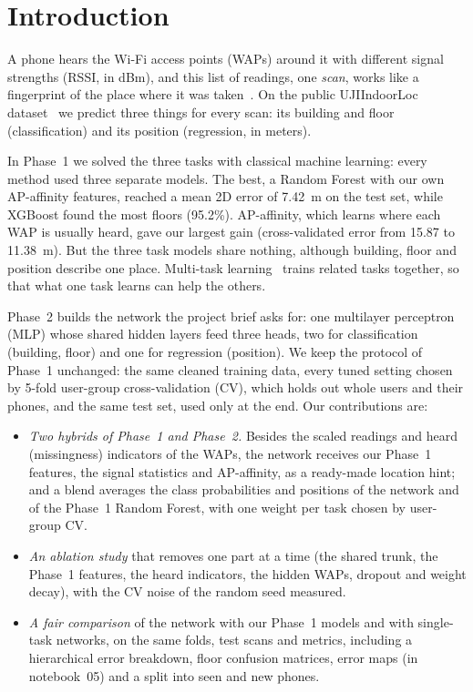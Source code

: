 \section{Introduction}\label{sec:intro}

A phone hears the Wi-Fi access points (WAPs) around it with different signal
strengths (RSSI, in dBm), and this list of readings, one \emph{scan}, works
like a fingerprint of the place where it was taken~\cite{he2016wifi}. On the
public UJIIndoorLoc dataset~\cite{torres2014ujiindoorloc} we predict three
things for every scan: its building and floor (classification) and its
position (regression, in meters).

In Phase~1 we solved the three tasks with classical machine learning: every
method used three separate models. The best, a Random Forest with our own
AP-affinity features, reached a mean 2D error of 7.42~m on the test set, while
XGBoost found the most floors (95.2\%). AP-affinity, which learns where each
WAP is usually heard, gave our largest gain (cross-validated error from 15.87
to 11.38~m). But the three task models share nothing, although building, floor
and position describe one place. Multi-task learning~\cite{caruana1997multitask}
trains related tasks together, so that what one task learns can help the
others.

Phase~2 builds the network the project brief asks for: one multilayer
perceptron (MLP) whose shared hidden layers feed three heads, two for
classification (building, floor) and one for regression (position). We keep the
protocol of Phase~1 unchanged: the same cleaned training data, every tuned
setting chosen by 5-fold user-group cross-validation (CV), which holds out whole
users and their phones, and the same test set, used only at the end. Our
contributions are:
\begin{itemize}
\item \emph{Two hybrids of Phase~1 and Phase~2.} Besides the scaled readings
  and heard (missingness) indicators of the WAPs, the network receives our
  Phase~1 features, the signal statistics and AP-affinity, as a ready-made
  location hint; and a blend averages the class probabilities and positions of
  the network and of the Phase~1 Random Forest, with one weight per task chosen
  by user-group CV.
\item \emph{An ablation study} that removes one part at a time (the shared
  trunk, the Phase~1 features, the heard indicators, the hidden WAPs, dropout
  and weight decay), with the CV noise of the random seed measured.
\item \emph{A fair comparison} of the network with our Phase~1 models and
  with single-task networks, on the same folds, test scans and metrics,
  including a hierarchical error breakdown, floor confusion matrices, error
  maps (in notebook~05) and a split into seen and new phones.
\end{itemize}
